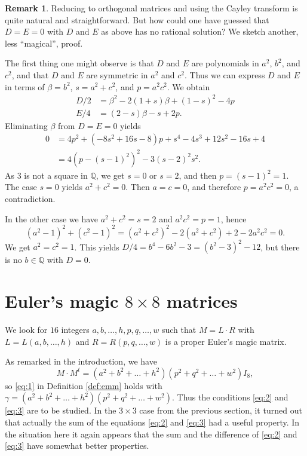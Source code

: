 \documentclass[12pt]{amsart}
\theoremstyle{definition}
\newtheorem{remark}[theorem]{Remark}
\newcommand{\QQ}{\mathbb Q}
\begin{document}
\begin{remark}
  Reducing to orthogonal matrices and using the Cayley transform is
  quite natural and straightforward. But how could one have guessed
  that $D=E=0$ with $D$ and $E$ as above has no rational solution? We
  sketch another, less ``magical'', proof.

  The first thing one might observe is that $D$ and $E$ are polynomials
  in $a^2$, $b^2$, and $c^2$, and that $D$ and $E$ are symmetric in
  $a^2$ and $c^2$. Thus we can express $D$ and $E$ in terms of
  $\beta=b^2$, $s=a^2+c^2$, and $p=a^2c^2$. We obtain
  \begin{align*}
    D/2 &= \beta^2 -2(1+s)\beta + (1-s)^2 - 4p\\
    E/4 &= (2-s)\beta - s + 2p.
  \end{align*}
Eliminating $\beta$ from $D=E=0$ yields
\begin{align*}
  0 &= 4 p^{2} + \left(-8 s^{2} + 16 s - 8\right) p + s^{4} - 4 s^{3}
      + 12 s^{2} - 16 s + 4\\
  &= 4(p-(s-1)^2)^2 -3(s - 2)^2s^2.
\end{align*}
As $3$ is not a square in $\QQ$, we get $s=0$ or $s=2$, and
then $p=(s-1)^2=1$. The case $s=0$ yields $a^2+c^2=0$. Then $a=c=0$,
and therefore $p=a^2c^2=0$, a contradiction.

In the other case we have $a^2+c^2=s=2$ and $a^2c^2=p=1$,
hence
\[
  (a^2-1)^2+(c^2-1)^2=(a^2+c^2)^2%
  -2(a^2+c^2)+2-2a^2c^2=0.
\]
We get $a^2=c^2=1$. This yields $D/4=b^4 - 6b^2 - 3=(b^2-3)^2-12$, but
there is no $b\in\QQ$ with $D=0$.
\end{remark}
\section{ Euler's magic \texorpdfstring{$8\times8$}{8} matrices}
We look for $16$ integers $a,b,\dots,h,p,q,\dots,w$ such that
$M=L\cdot R$ with $L=L(a,b,\dots,h)$ and $R=R(p,q,\dots,w)$ is a
proper Euler's magic matrix.

As remarked in the introduction, we have
\[
  M\cdot M^t=(a^2+b^2+\dots+h^2)(p^2+q^2+\dots+w^2)I_8,
\]
so \eqref{eq:1} in Definition \ref{def:emm} holds with
$\gamma=(a^2+b^2+\dots+h^2)(p^2+q^2+\dots+w^2)$. Thus the conditions
\eqref{eq:2} and \eqref{eq:3} are to be studied. In the $3\times 3$
case from the previous section, it turned out that actually the sum of
the equations \eqref{eq:2} and \eqref{eq:3} had a useful property. In
the situation here it again appears that the sum and the difference of
\eqref{eq:2} and \eqref{eq:3} have somewhat better properties.
\end{document}
